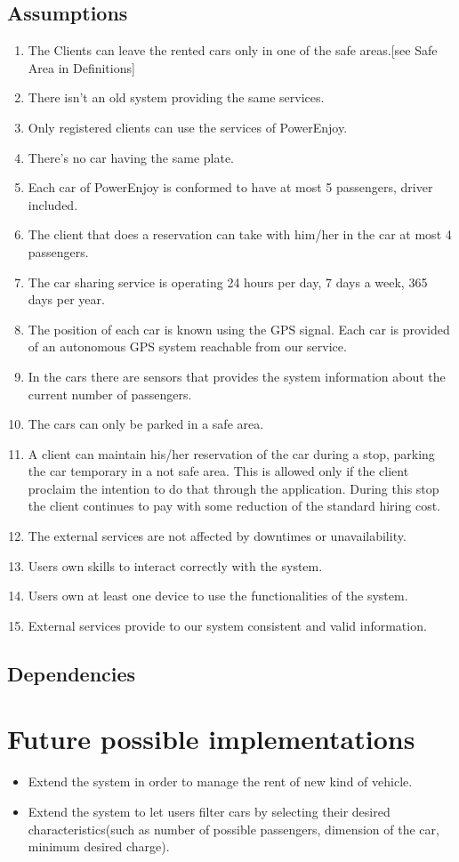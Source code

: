 \subsection{Assumptions}
\begin{enumerate}[label=A\arabic*]
\item The Clients can leave the rented cars only in one of the safe areas.[see Safe Area in Definitions]
\item There isn’t an old system providing the same services.
\item Only registered clients can use the services of PowerEnjoy.
\item There’s no car having the same plate.
\item Each car of PowerEnjoy is conformed to have at most 5 passengers, driver included.
\item The client that does a reservation can take with him/her in the car at most 4 passengers.
\item The car sharing service is operating 24 hours per day, 7 days a week, 365 days per year.
\item The position of each car is known using the GPS signal. Each car is provided of an autonomous GPS system reachable from our service.
\item In the cars there are sensors that provides the system information about the current number of passengers.
\item The cars can only be parked in a safe area.
\item A client can maintain his/her reservation of the car during a stop, parking the car temporary in a not safe area. This is allowed only if the client proclaim the intention to do that through the application. During this stop the client continues to pay with some reduction of the standard hiring cost.
\item The external services are not affected by downtimes or unavailability.
\item Users own skills to interact correctly with the system.
\item Users own at least one device to use the functionalities of the system.
\item External services provide to our system consistent and valid information.
\end{enumerate}

\subsection{Dependencies}

\section{Future possible implementations}
\begin{itemize}
\item Extend  the system in order to manage the rent of new kind of vehicle.
\item Extend the system to let users filter cars by selecting their desired characteristics(such as number of possible passengers, dimension of the car, minimum desired charge).
\end{itemize}